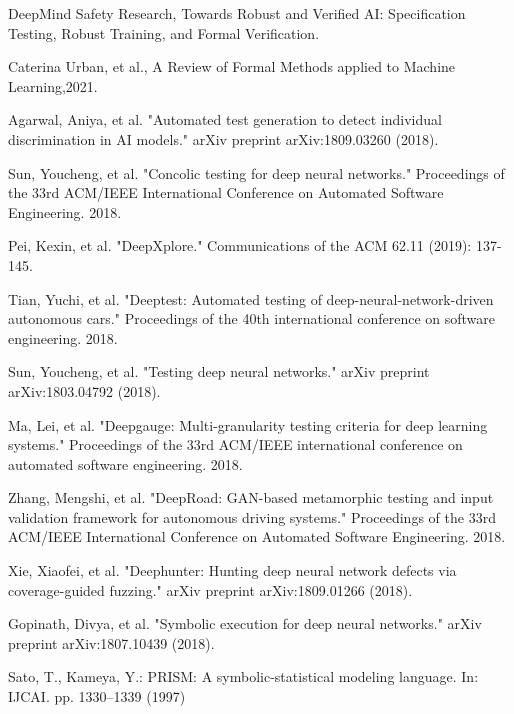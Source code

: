\begin{singlespace}
\begin{thebibliography}{}
    DeepMind Safety Research, Towards Robust and Verified AI: Specification Testing, Robust Training, and Formal Verification.

    Caterina Urban, et al., A Review of Formal Methods applied to Machine Learning,2021.

    






 Agarwal, Aniya, et al. "Automated test generation to detect individual discrimination in AI models." arXiv preprint arXiv:1809.03260 (2018).

 Sun, Youcheng, et al. "Concolic testing for deep neural networks." Proceedings of the 33rd ACM/IEEE International Conference on Automated Software Engineering. 2018.

 Pei, Kexin, et al. "DeepXplore." Communications of the ACM 62.11 (2019): 137-145.

 Tian, Yuchi, et al. "Deeptest: Automated testing of deep-neural-network-driven autonomous cars." Proceedings of the 40th international conference on software engineering. 2018.

 Sun, Youcheng, et al. "Testing deep neural networks." arXiv preprint arXiv:1803.04792 (2018).

 Ma, Lei, et al. "Deepgauge: Multi-granularity testing criteria for deep learning systems." Proceedings of the 33rd ACM/IEEE international conference on automated software engineering. 2018.

 Zhang, Mengshi, et al. "DeepRoad: GAN-based metamorphic testing and input validation framework for autonomous driving systems." Proceedings of the 33rd ACM/IEEE International Conference on Automated Software Engineering. 2018.

 Xie, Xiaofei, et al. "Deephunter: Hunting deep neural network defects via coverage-guided fuzzing." arXiv preprint arXiv:1809.01266 (2018).

	Gopinath, Divya, et al. "Symbolic execution for deep neural networks." arXiv preprint arXiv:1807.10439 (2018).


 Sato, T., Kameya, Y.: PRISM: A symbolic-statistical modeling language. In: IJCAI. pp. 1330--1339 (1997)


\end{thebibliography}
\end{singlespace}
